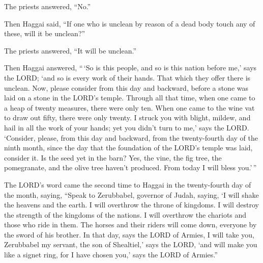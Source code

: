 The priests answered, ``No.''

 Then Haggai said, ``If one who is unclean by reason of a
dead body touch any of these, will it be unclean?''

The priests answered, ``It will be unclean.''

 Then Haggai answered, ``\,`So is this people, and so is
this nation before me,' says the LORD; `and so is every work of their
hands. That which they offer there is unclean.  Now,
please consider from this day and backward, before a stone was laid on a
stone in the LORD's temple.  Through all that time, when
one came to a heap of twenty measures, there were only ten. When one
came to the wine vat to draw out fifty, there were only twenty.
 I struck you with blight, mildew, and hail in all the
work of your hands; yet you didn't turn to me,' says the LORD.
 `Consider, please, from this day and backward, from the
twenty-fourth day of the ninth month, since the day that the foundation
of the LORD's temple was laid, consider it.  Is the seed
yet in the barn? Yes, the vine, the fig tree, the pomegranate, and the
olive tree haven't produced. From today I will bless you.'\,''

 The LORD's word came the second time to Haggai in the
twenty-fourth day of the month, saying,  ``Speak to
Zerubbabel, governor of Judah, saying, `I will shake the heavens and the
earth.  I will overthrow the throne of kingdoms. I will
destroy the strength of the kingdoms of the nations. I will overthrow
the chariots and those who ride in them. The horses and their riders
will come down, everyone by the sword of his brother.  In
that day, says the LORD of Armies, I will take you, Zerubbabel my
servant, the son of Shealtiel,' says the LORD, `and will make you like a
signet ring, for I have chosen you,' says the LORD of Armies.''
